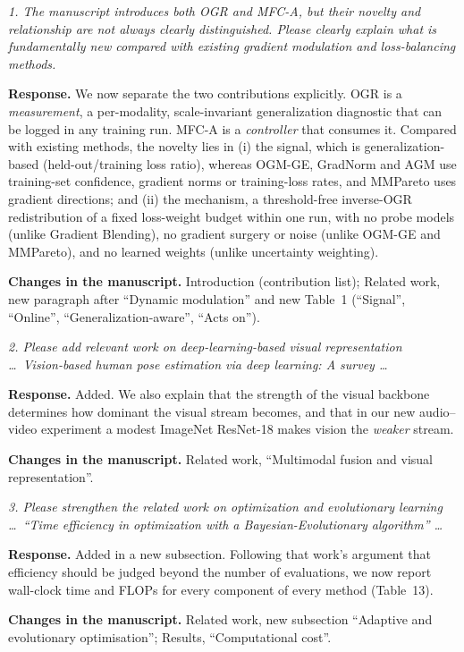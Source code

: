 \documentclass[11pt,a4paper]{article}
\newcommand{\rc}[1]{\par\noindent\colorbox{gray!12}{\parbox{\dimexpr\linewidth-2\fboxsep}{\small\textit{#1}}}\par}
\newcommand{\resp}{\par\noindent\textbf{Response.} }
\newcommand{\chg}{\par\noindent\textbf{Changes in the manuscript.} }
\begin{document}
\rc{1. The manuscript introduces both OGR and MFC-A, but their novelty and relationship are not always clearly distinguished. Please clearly explain what is fundamentally new compared with existing gradient modulation and loss-balancing methods.}
\resp We now separate the two contributions explicitly. OGR is a \emph{measurement}, a per-modality, scale-invariant generalization diagnostic that can be logged in any training run. MFC-A is a \emph{controller} that consumes it. Compared with existing methods, the novelty lies in (i) the signal, which is generalization-based (held-out/training loss ratio), whereas OGM-GE, GradNorm and AGM use training-set confidence, gradient norms or training-loss rates, and MMPareto uses gradient directions; and (ii) the mechanism, a threshold-free inverse-OGR redistribution of a fixed loss-weight budget within one run, with no probe models (unlike Gradient Blending), no gradient surgery or noise (unlike OGM-GE and MMPareto), and no learned weights (unlike uncertainty weighting).
\chg Introduction (contribution list); Related work, new paragraph after ``Dynamic modulation'' and new Table~1 (``Signal'', ``Online'', ``Generalization-aware'', ``Acts on'').

\rc{2. Please add relevant work on deep-learning-based visual representation \ldots\ Vision-based human pose estimation via deep learning: A survey \ldots}
\resp Added. We also explain that the strength of the visual backbone determines how dominant the visual stream becomes, and that in our new audio--video experiment a modest ImageNet ResNet-18 makes vision the \emph{weaker} stream.
\chg Related work, ``Multimodal fusion and visual representation''.

\rc{3. Please strengthen the related work on optimization and evolutionary learning \ldots\ ``Time efficiency in optimization with a Bayesian-Evolutionary algorithm'' \ldots}
\resp Added in a new subsection. Following that work's argument that efficiency should be judged beyond the number of evaluations, we now report wall-clock time and FLOPs for every component of every method (Table~13).
\chg Related work, new subsection ``Adaptive and evolutionary optimisation''; Results, ``Computational cost''.
\end{document}
